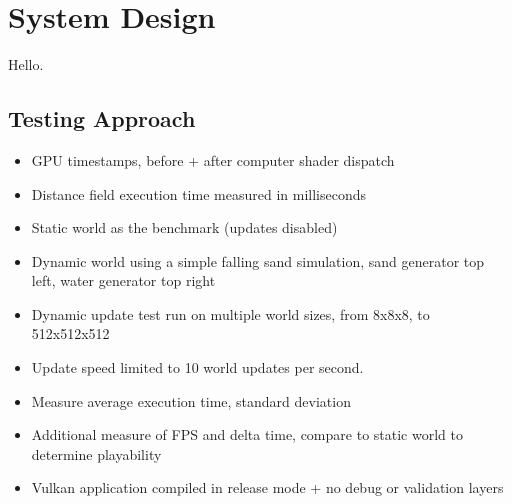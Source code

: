 \chapter{System Design} \label{chapter:system_design}
Hello.

\section{Testing Approach}

\begin{itemize}
    \item GPU timestamps, before + after computer shader dispatch
    \item Distance field execution time measured in milliseconds
    \item Static world as the benchmark (updates disabled)
    \item Dynamic world using a simple falling sand simulation, sand generator top left, water generator top right
    \item Dynamic update test run on multiple world sizes, from 8x8x8, to 512x512x512
    \item Update speed limited to 10 world updates per second.
    \item Measure average execution time, standard deviation
    \item Additional measure of FPS and delta time, compare to static world to determine playability
    \item Vulkan application compiled in release mode + no debug or validation layers
\end{itemize}
